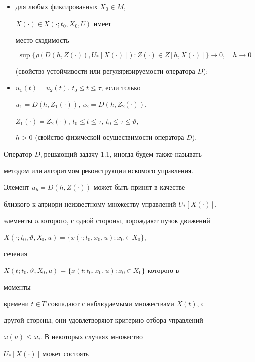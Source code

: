 \begin{itemize} 


\item[1)] для любых фиксированных $X_0\in M$, 


$X(\cdot)\in X(\cdot;t_0,X_0,U)$ имеет 


место сходимость 


$$ 


\sup\{\rho(D(h,Z(\cdot)),U_*[X(\cdot)]):Z(\cdot)\in 


Z[h,X(\cdot)]\}\to 0,\quad h\to 0 


$$ 


(свойство устойчивости или регуляризируемости оператора $D$); 


\item[2)] $u_1(t)=u_2(t)$, $t_0\le t\le\tau$, если только 


$u_1=D(h,Z_1(\cdot))$, $u_2=D(h,Z_2(\cdot))$,  


$Z_1(\cdot)=Z_2(\cdot)$, $t_0\le t\le\tau$, $t_0\le\tau\le\vartheta$, 


$h>0$ (свойство физической осуществимости оператора $D$). 


\end{itemize} 


\medskip 


 


Оператор $D$, решающий задачу 1.1, иногда будем также называть 


методом или алгоритмом реконструкции искомого управления. 


Элемент $u_h=D(h,Z(\cdot))$ может быть принят в качестве 


близкого к априори неизвестному множеству управлений $U_*[X(\cdot)]$, 


элементы $u$ которого, с одной стороны, порождают пучок движений 


$X(\cdot;t_0,\vartheta,X_0,u)=\{x(\cdot;t_0,x_0,u):x_0\in X_0\}$, 


сечения 


$X(t;t_0,\vartheta,X_0,u)=\{x(t;t_0,x_0,u):x_0\in X_0\}$ которого в 


моменты 


времени $t\in T$ совпадают с наблюдаемыми множествами $X(t)$, с 


другой стороны, они удовлетворяют критерию отбора управлений 


$\omega(u)\le\omega_*$. В некоторых случаях множество 


$U_*[X(\cdot)]$ может состоять 


